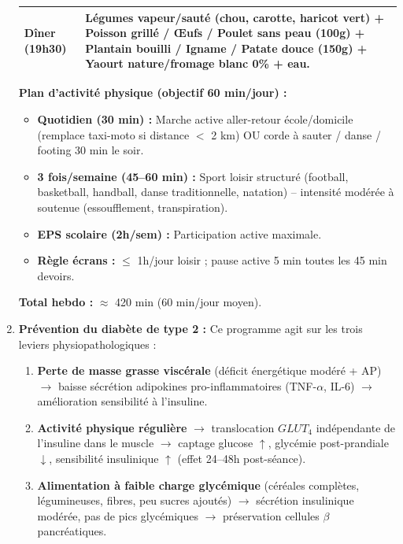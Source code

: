 \documentclass[11pt]{article}
\begin{document}
\begin{corrige}
\begin{enumerate}
\begin{center}
\begin{tabularx}{\linewidth}{|l|X|}
\textbf{Dîner} (19h30) & \textbf{Légumes vapeur/sauté} (chou, carotte, haricot vert) + \textbf{Poisson grillé / Œufs / Poulet sans peau} (100g) + \textbf{Plantain bouilli / Igname / Patate douce} (150g) + Yaourt nature/fromage blanc 0\% + eau. \\ \hline
\end{tabularx}
\end{center}
\textbf{Plan d'activité physique (objectif 60 min/jour) :}
\begin{itemize}
\item \textbf{Quotidien (30 min) :} Marche active aller-retour école/domicile (remplace taxi-moto si distance $<$ 2 km) OU corde à sauter / danse / footing 30 min le soir.
\item \textbf{3 fois/semaine (45--60 min) :} Sport loisir structuré (football, basketball, handball, danse traditionnelle, natation) -- intensité modérée à soutenue (essoufflement, transpiration).
\item \textbf{EPS scolaire (2h/sem) :} Participation active maximale.
\item \textbf{Règle écrans :} $\le$ 1h/jour loisir ; pause active 5 min toutes les 45 min devoirs.
\end{itemize}
\textbf{Total hebdo :} $\approx$ 420 min (60 min/jour moyen).

\item \textbf{Prévention du diabète de type 2 :} Ce programme agit sur les trois leviers physiopathologiques :
\begin{enumerate}
\item \textbf{Perte de masse grasse viscérale} (déficit énergétique modéré + AP) $\rightarrow$ baisse sécrétion adipokines pro-inflammatoires (TNF-$\alpha$, IL-6) $\rightarrow$ amélioration sensibilité à l'insuline.
\item \textbf{Activité physique régulière} $\rightarrow$ translocation $GLUT_4$ indépendante de l'insuline dans le muscle $\rightarrow$ captage glucose $\uparrow$, glycémie post-prandiale $\downarrow$, sensibilité insulinique $\uparrow$ (effet 24--48h post-séance).
\item \textbf{Alimentation à faible charge glycémique} (céréales complètes, légumineuses, fibres, peu sucres ajoutés) $\rightarrow$ sécrétion insulinique modérée, pas de pics glycémiques $\rightarrow$ préservation cellules $\beta$ pancréatiques.
\end{enumerate}
\end{enumerate}
\end{corrige}
\end{document}
